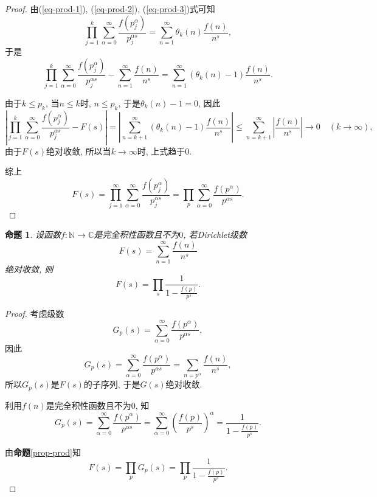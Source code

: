 \documentclass[12pt, a4paper, oneside]{ctexart}
\newtheorem{proposition}{命题}[section]
\numberwithin{equation}{section}  %
\let\leq=\leqslant %
\def\N{\mathbb{N}}          %
\def\C{\mathbb{C}}          %
\begin{document}
\begin{proof}
    由(\ref{eq-prod-1}), (\ref{eq-prod-2}), (\ref{eq-prod-3})式可知
    \begin{equation*}
        \prod_{j=1}^k\sum_{\alpha=0}^\infty\frac{f(p_j^{\alpha})}{p_j^{\alpha s}} = \sum_{n=1}^\infty\theta_k(n)\frac{f(n)}{n^s},
    \end{equation*}
    于是
    \begin{equation*}
        \prod_{j=1}^k\sum_{\alpha=0}^\infty\frac{f(p_j^{\alpha})}{p_j^{\alpha s}} -\sum_{n=1}^\infty\frac{f(n)}{n^s} = \sum_{n=1}^\infty(\theta_k(n)-1)\frac{f(n)}{n^s}.
    \end{equation*}

    由于$k\leq p_k$, 当$n\leq k$时, $n\leq p_k$, 于是$\theta_k(n) - 1 = 0$, 因此
    \begin{equation*}
        \left|\prod_{j=1}^k\sum_{\alpha=0}^\infty\frac{f(p_j^{\alpha})}{p_j^{\alpha s}}-F(s)\right|=\left|\sum_{n=k+1}^\infty(\theta_k(n)-1)\frac{f(n)}{n^s}\right|\leq \sum_{n=k+1}^\infty\left|\frac{f(n)}{n^{s}}\right|\to 0\quad(k\to \infty),
    \end{equation*}
    由于$F(s)$绝对收敛, 所以当$k\to\infty$时, 上式趋于$0$.

    综上
    \begin{equation*}
        F(s) = \prod_{j=1}^\infty\sum_{\alpha=0}^\infty\frac{f(p_j^{\alpha})}{p_j^{\alpha s}} = \prod_p\sum_{\alpha = 0}^\infty\frac{f(p^{\alpha})}{p^{\alpha s}}.
    \end{equation*}
\end{proof}
\begin{proposition}\label{prop-prod-series}
    设函数$f:\N\to \C$是完全积性函数且不为$0$, 若Dirichlet级数
    \begin{equation*}
        F(s)=\sum_{n=1}^\infty\frac{f(n)}{n^s}
    \end{equation*}
    绝对收敛, 则
    \begin{equation*}
        F(s) = \prod_s\frac{1}{1-\frac{f(p)}{p^s}}.
    \end{equation*}
\end{proposition}
\begin{proof}
    考虑级数
    \begin{equation*}
        G_p(s) = \sum_{\alpha = 0}^\infty\frac{f(p^\alpha)}{p^{\alpha s}},
    \end{equation*}
    因此
    \begin{equation*}
        G_p(s) = \sum_{\alpha = 0}^\infty \frac{f(p^{\alpha})}{p^{\alpha s}} = \sum_{n= p^{\alpha}}\frac{f(n)}{n^s},
    \end{equation*}
    所以$G_p(s)$是$F(s)$的子序列, 于是$G(s)$绝对收敛.

    利用$f(n)$是完全积性函数且不为$0$, 知
    \begin{equation*}
        G_p(s) = \sum_{\alpha = 0}^{\infty}\frac{f(p^{\alpha})}{p^{\alpha s}} = \sum_{\alpha =0}^\infty\left(\frac{f(p)}{p^s}\right)^{\alpha} = \frac{1}{1-\frac{f(p)}{p^s}}.
    \end{equation*}

    由\textbf{命题}\ref{prop-prod}知
    \begin{equation*}
        F(s) = \prod_p G_p(s) = \prod_p\frac{1}{1-\frac{f(p)}{p^s}}.
    \end{equation*}
\end{proof}
\end{document}
